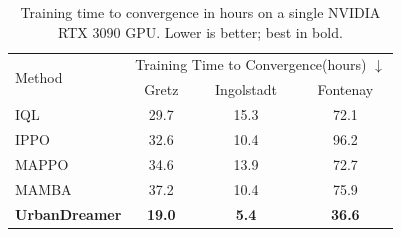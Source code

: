 \begin{table}[t]
  \centering
  \caption{Training time to convergence in hours on a single NVIDIA RTX 3090 GPU. Lower is better; best in bold.}
  \renewcommand{\arraystretch}{1.0}
  \setlength{\tabcolsep}{12pt}
  \begin{tabular}{lccc}
    \toprule
    \multirow{2}{*}{Method} & \multicolumn{3}{c}{Training Time to Convergence(hours) $\downarrow$} \\
    & Gretz & Ingolstadt & Fontenay \\
    \midrule
    IQL & 29.7 & 15.3 & 72.1 \\
    IPPO & 32.6 & 10.4 & 96.2 \\
    MAPPO & 34.6 & 13.9 & 72.7 \\
    MAMBA & 37.2 & 10.4 & 75.9 \\
    \textbf{UrbanDreamer} & \textbf{19.0} & \textbf{5.4} & \textbf{36.6} \\
    \bottomrule
  \end{tabular}
  \label{tab:computation-efficiency}
\end{table}